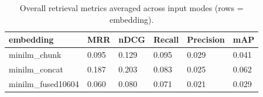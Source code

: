 \begin{table}
\caption{Overall retrieval metrics averaged across input modes (rows = embedding).}
\label{tab:overview-by-embedding}
\begin{tabular}{llllll}
\toprule
embedding & MRR & nDCG & Recall & Precision & mAP \\
\midrule
minilm_chunk & 0.095 & 0.129 & 0.095 & 0.029 & 0.041 \\
minilm_concat & 0.187 & 0.203 & 0.083 & 0.025 & 0.062 \\
minilm_fused10604 & 0.060 & 0.080 & 0.071 & 0.021 & 0.029 \\
\bottomrule
\end{tabular}
\end{table}
